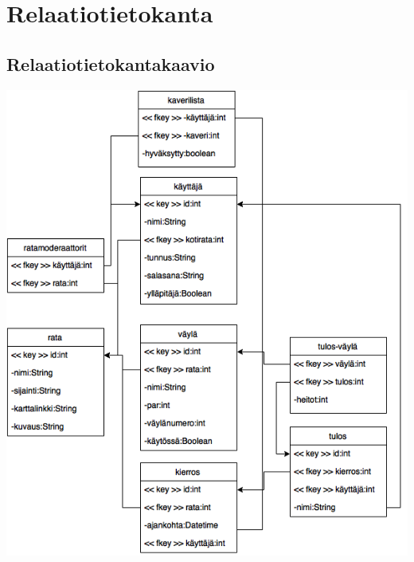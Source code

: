 \documentclass[10pt,a4paper]{article}
\begin{document}
\section{Relaatiotietokanta}
\subsection{Relaatiotietokantakaavio}
\includegraphics[scale=0.6]{tsoha_relaatiotietokantakaavio}
\end{document}
